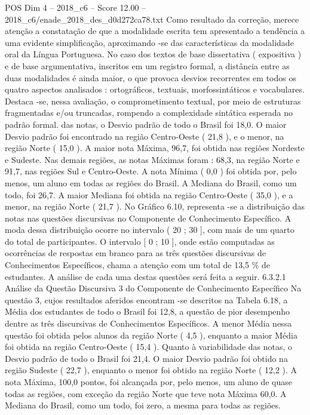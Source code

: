 \begin{textsample}{POS Dim 4 – 2018\_c6 – Score 12.00 – 2018\_c6/enade\_2018\_des\_d0d272ca78.txt}
Como resultado da correção, merece atenção a constatação de que a modalidade escrita tem apresentado a tendência a uma evidente simplificação, aproximando -se das características da modalidade oral da Língua Portuguesa.
No caso dos textos de base dissertativa ( expositiva ) e de base argumentativa, inscritos em um registro formal, a distância entre as duas modalidades é ainda maior, o que provoca desvios recorrentes em todos os quatro aspectos analisados : ortográficos, textuais, morfossintáticos e vocabulares.
Destaca -se, nessa avaliação, o comprometimento textual, por meio de estruturas fragmentadas e/ou truncadas, rompendo a complexidade sintática esperada no padrão formal. das notas, o Desvio padrão de todo o Brasil foi 18,0.
O maior Desvio padrão foi encontrado na região Centro-Oeste ( 21,8 ), e o menor, na região Norte ( 15,0 ).
A maior nota Máxima, 96,7, foi obtida nas regiões Nordeste e Sudeste.
Nas demais regiões, as notas Máximas foram : 68,3, na região Norte e 91,7, nas regiões Sul e Centro-Oeste.
A nota Mínima ( 0,0 ) foi obtida por, pelo menos, um aluno em todas as regiões do Brasil.
A Mediana do Brasil, como um todo, foi 26,7.
A maior Mediana foi obtida na região Centro-Oeste ( 35,0 ), e a menor, na região Norte ( 21,7 ).
No Gráfico 6.10, representa -se a distribuição das notas nas questões discursivas no Componente de Conhecimento Específico.
A moda dessa distribuição ocorre no intervalo ( 20 ; 30 ], com mais de um quarto do total de participantes.
O intervalo [ 0 ; 10 ], onde estão computadas as ocorrências de respostas em branco para as três questões discursivas de Conhecimentos Específicos, chama a atenção com um total de 13,5 \% de estudantes.
A análise de cada uma destas questões será feita a seguir. 6.3.2.1 Análise da Questão Discursiva 3 do Componente de Conhecimento Específico Na questão 3, cujos resultados aferidos encontram -se descritos na Tabela 6.18, a Média dos estudantes de todo o Brasil foi 12,8, a questão de pior desempenho dentre as três discursivas de Conhecimentos Específicos.
A menor Média nessa questão foi obtida pelos alunos da região Norte ( 4,5 ), enquanto a maior Média foi obtida na região Centro-Oeste ( 15,4 ).
Quanto à variabilidade das notas, o Desvio padrão de todo o Brasil foi 21,4.
O maior Desvio padrão foi obtido na região Sudeste ( 22,7 ), enquanto o menor foi obtido na região Norte ( 12,2 ).
A nota Máxima, 100,0 pontos, foi alcançada por, pelo menos, um aluno de quase todas as regiões, com exceção da região Norte que teve nota Máxima 60,0.
A Mediana do Brasil, como um todo, foi zero, a mesma para todas as regiões.

\end{textsample}

